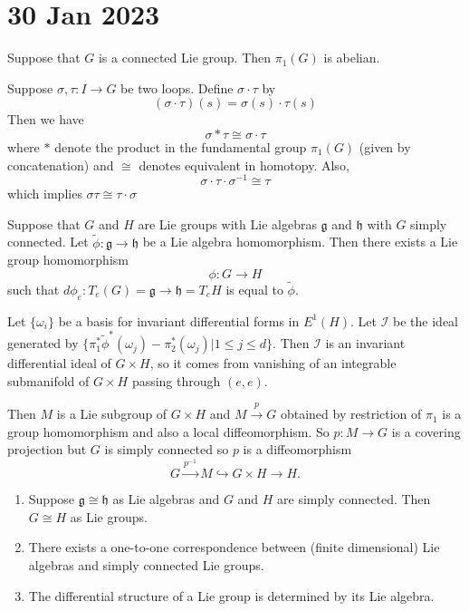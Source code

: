 \documentclass[11pt,a4paper]{scrarticle}
\theoremstyle{definition}
\renewenvironment{proof}[1][\proofname]{\vspace{-15pt}\begin{myproof}}{\end{myproof}}
\theoremstyle{greenbox}
\begin{document}
\section{30 Jan 2023}
\vspace{0.5cm}
\begin{lemma}
    Suppose that $ G $ is a connected Lie group. Then $ \pi_{1}(G) $ is abelian.
\end{lemma}
\begin{proof}
    Suppose $ \sigma, \tau : I \to G $ be two loops. Define $ \sigma \cdot \tau $ by 
    \[ (\sigma \cdot \tau)(s) = \sigma (s) \cdot \tau (s) \]
    Then we have 
    \[ \sigma * \tau \cong \sigma \cdot \tau \]
    where $ * $ denote the product in the fundamental group $ \pi_{1}(G) $ (given by concatenation) and $ \cong $ denotes equivalent in homotopy. Also, 
    \[ \sigma \cdot \tau \cdot \sigma^{-1} \cong \tau\]
    which implies $  \sigma \tau \cong \tau \cdot \sigma $
\end{proof}
\begin{thm}
    Suppose that $ G $ and $ H $ are Lie groups with Lie algebras $ \mathfrak{g} $ and $ \mathfrak{h} $ with $ G $ simply connected. Let $ \tilde{\phi} : \mathfrak{g} \to \mathfrak{h} $ be a Lie algebra homomorphism. Then there exists a Lie group homomorphism 
    \[ \phi : G \to H \]
    such that $ d \phi_{e} : T_{e}(G) = \mathfrak{g}\to \mathfrak{h} = T_{e}H $ is equal to $ \tilde{\phi} $.
\end{thm}
\begin{proof}
    [Idea] Let $ \{\omega_{i}\} $ be a basis for invariant differential forms in $ E^{1}(H) $. Let $ \mathscr{I} $ be the ideal generated by $ \{\pi_{1}^{*}\tilde{\phi}^{*}(\omega_{j}) - \pi_{2}^{*}(\omega_{j})| 1\le j \le d\} $. Then $ \mathscr{I} $ is an invariant differential ideal of $ G \times H $, so it comes from vanishing of an integrable submanifold of $ G \times H $ passing through $ (e,e) $. 

    Then $ M $ is a Lie subgroup of $ G \times H $ and $ M \xrightarrow{p} G $ obtained by restriction of $ \pi_{1} $ is a group homomorphism and also a local diffeomorphism. So $ p: M \to G $ is a covering projection but $ G $ is simply connected so $ p $ is a diffeomorphism 
    \[ G \xrightarrow{p^{-1}} M \hookrightarrow G \times H \to H. \]
\end{proof}

\begin{corollary}
    \begin{enumerate}
        \item Suppose $ \mathfrak{ g} \cong \mathfrak{h} $ as Lie algebras and $ G $ and $ H $ are simply connected. Then $ G \cong H $ as Lie groups.
        \item There exists a one-to-one correspondence between (finite dimensional) Lie algebras and simply connected Lie groups.
        \item The differential structure of a Lie group is determined by its Lie algebra.
    \end{enumerate}
\end{corollary}
\end{document}
